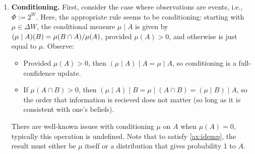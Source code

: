\begin{enumerate}[wide, label=\textbf{\thesubsection.\arabic*}]
	\item %
	\textbf{Conditioning.}
	First, consider the case where observations are events, i.e., $\Phi := 2^W$.
	Here, the appropriate rule seems to be conditioning:
	starting with $\mu \in \Delta W$, the conditional measure 
	$\mu\mid A$ is given by $(\mu \mid A)(B) = {\mu(B \cap A)}/{\mu(A)}$, provided $\mu(A) > 0$,
	and otherwise is just equal to $\mu$.
	Observe:
	\begin{itemize}[nosep, leftmargin=1.2em]
		\item Provided $\mu(A) > 0$, then $(\mu\mid A) \mid A = \mu \mid A$, so conditioning is a full-confidence update.
		\item If $\mu(A \cap B) > 0$, then $(\mu \mid A) \mid B = \mu \mid (A \cap B) = (\mu \mid B) \mid A$, so the order that information is recieved does not matter (so long as it is consistent with one's beliefs).
	\end{itemize}
	There are well-known issues with conditioning $\mu$ on $A$ when
	$\mu(A) = 0$, typically this operation is undefined. Note that to satisfy
	\cref{ax:idemp}, the result must either be $\mu$ itself or a
	 distribution that gives probability 1 to $A$. 


\end{enumerate}
